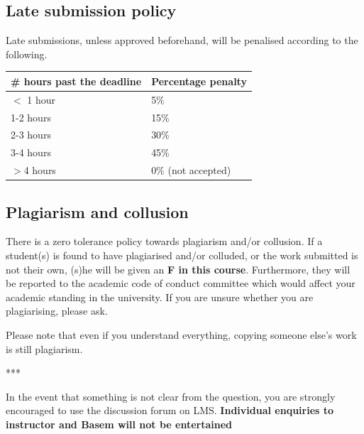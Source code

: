 \documentclass[a4paper, 11pt]{article}
\begin{document}
\subsection{Late submission policy}
Late submissions, unless approved beforehand, will be penalised according to the following. 
\begin{center}
    \begin{tabular}{ | l | l |}
    \hline
    \# hours past the deadline & Percentage penalty  \\ \hline
    $<$ 1 hour & 5\% \\ \hline
    1-2 hours & 15\% \\ \hline
    2-3 hours & 30\% \\ \hline
    3-4 hours & 45\% \\ \hline
    $>$4  hours & 0\% (not accepted) \\ \hline
    \end{tabular}
\end{center}


\subsection{Plagiarism and collusion}
There is a zero tolerance policy towards plagiarism and/or collusion. If a student(s) is found to have plagiarised and/or colluded, or the work submitted is not their own, (s)he will be given an \textbf{F in this course}. Furthermore, they will be reported to the academic code of conduct committee which would affect your academic standing in the university. If you are unsure whether you are plagiarising, please ask.

Please note that even if you understand everything, copying someone else's work is still plagiarism.
\begin{center}
***
\end{center}


In the event that something is not clear from the question, you are strongly encouraged to use the discussion forum on LMS. \textbf{Individual enquiries to instructor and Basem will not be entertained}
\end{document}

